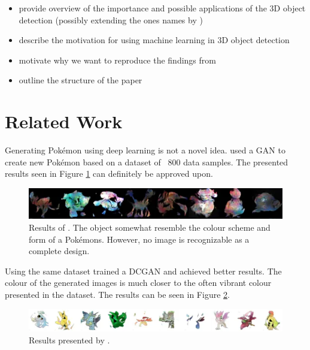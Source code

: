 \documentclass[12pt]{article}
\theoremstyle{plain}
\theoremstyle{definition}
\theoremstyle{remark}
\begin{document}
\begin{itemize}
	\item provide overview of the importance and possible applications of the 3D object detection (possibly extending the ones names by )
	\item describe the motivation for using machine learning in 3D object detection
	\item motivate why we want to reproduce the findings from 
	\item outline the structure of the paper
\end{itemize}
%
%
\section{Related Work}
\label{sec:relwork}
Generating Pokémon using deep learning is not a novel idea. \cite{Kleiber2020} used a \ac{GAN} to create new Pokémon based on a dataset of ~800 data samples. The presented results seen in Figure \ref{fig:kleiberresults} can definitely be approved upon.\\
 

 \begin{figure}[h]
	\centering
	\includegraphics[width=1\linewidth]{src/Images/Kleiber_results}
	\caption[Results of \cite{Kleiber2020}]{Results of \cite{Kleiber2020}. The object somewhat resemble the colour scheme and form of a Pokémons. However, no image is recognizable as a complete design.}
	\label{fig:kleiberresults}
\end{figure}

Using the same dataset \cite{Chambel2022} trained a \ac{DCGAN} and achieved better results. The colour of the generated images is much closer to the often vibrant colour presented in the dataset. The results can be seen in Figure \ref{fig:chambelresults}.

\begin{figure}[h]
	\centering
	\includegraphics[width=1\linewidth]{src/Images/Chambel_results}
	\caption[Results presented by \cite{Chambel2022}]{Results presented by \cite{Chambel2022}.}
	\label{fig:chambelresults}
\end{figure}
\end{document}

